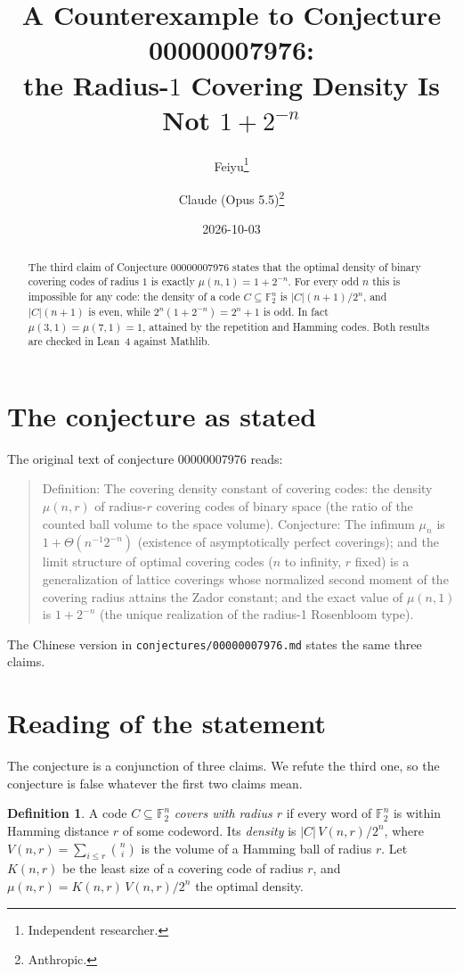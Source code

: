 \documentclass[11pt]{article}
\title{A Counterexample to Conjecture 00000007976:\\
the Radius-$1$ Covering Density Is Not $1+2^{-n}$}
\author{%
  Feiyu\thanks{Independent researcher.}
  \and
  Claude (Opus 5.5)\thanks{Anthropic.}%
}
\date{2026-10-03}
\theoremstyle{plain}
\theoremstyle{definition}
\newtheorem{definition}[theorem]{Definition}
\theoremstyle{remark}
\newcommand{\F}{\mathbb F}
\begin{document}
\maketitle

\begin{abstract}
The third claim of Conjecture 00000007976 states that the optimal density of binary
covering codes of radius $1$ is exactly $\mu(n,1)=1+2^{-n}$. For every odd $n$ this
is impossible for any code: the density of a code $C\subseteq\F_2^n$ is
$|C|(n+1)/2^n$, and $|C|(n+1)$ is even, while $2^n(1+2^{-n})=2^n+1$ is odd. In fact
$\mu(3,1)=\mu(7,1)=1$, attained by the repetition and Hamming codes. Both results are
checked in Lean~4 against Mathlib.
\end{abstract}

\section{The conjecture as stated}

The original text of conjecture 00000007976 reads:

\begin{quote}
Definition: The covering density constant of covering codes: the density $\mu(n,r)$ of
radius-$r$ covering codes of binary space (the ratio of the counted ball volume to the
space volume). Conjecture: The infimum $\mu_n$ is $1 + \Theta(n^{-1} 2^{-n})$
(existence of asymptotically perfect coverings); and the limit structure of optimal
covering codes ($n$ to infinity, $r$ fixed) is a generalization of lattice coverings
whose normalized second moment of the covering radius attains the Zador constant; and
the exact value of $\mu(n,1)$ is $1 + 2^{-n}$ (the unique realization of the radius-1
Rosenbloom type).
\end{quote}

The Chinese version in \texttt{conjectures/00000007976.md} states the same three
claims.

\section{Reading of the statement}

The conjecture is a conjunction of three claims. We refute the third one, so the
conjecture is false whatever the first two claims mean.

\begin{definition}
A code $C\subseteq\F_2^n$ \emph{covers with radius $r$} if every word of $\F_2^n$ is
within Hamming distance $r$ of some codeword. Its \emph{density} is
$|C|\,V(n,r)/2^n$, where $V(n,r)=\sum_{i\le r}\binom ni$ is the volume of a Hamming
ball of radius $r$. Let $K(n,r)$ be the least size of a covering code of radius $r$,
and $\mu(n,r)=K(n,r)\,V(n,r)/2^n$ the optimal density.
\end{definition}
\end{document}
